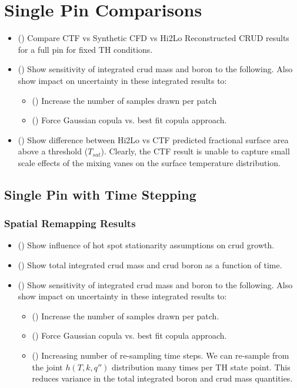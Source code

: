 \section{Single Pin Comparisons}

\begin{itemize}
    \item (\checkmark) Compare CTF vs Synthetic CFD vs Hi2Lo Reconstructed CRUD results for a full pin for fixed TH conditions.
    \item (\checkmark) Show sensitivity of integrated crud mass and boron to the following.  Also show impact on uncertainty in these integrated results to:
        \begin{itemize}
            \item (\checkmark) Increase the number of samples drawn per patch
            \item (\checkmark) Force Gaussian copula vs. best fit copula approach.
        \end{itemize}
    \item (\checkmark) Show difference between Hi2Lo vs CTF predicted fractional surface area above a threshold ($T_{sat}$).  Clearly, the CTF result
        is unable to capture small scale effects of the mixing vanes on the surface temperature distribution.
\end{itemize}

\subsection{Single Pin with Time Stepping}

\subsubsection{Spatial Remapping Results}
\begin{itemize}
    \item (\checkmark) Show influence of hot spot stationarity assumptions on crud growth.
\end{itemize}

\begin{itemize}
    \item (\checkmark) Show total integrated crud mass and crud boron as a function of time.
    \item (\checkmark) Show sensitivity of integrated crud mass and boron to the following.  Also show impact on uncertainty in these integrated results to:
        \begin{itemize}
            \item (\checkmark) Increase the number of samples drawn per patch.
            \item (\checkmark) Force Gaussian copula vs. best fit copula approach.
            \item (\checkmark) Increasing number of re-sampling time steps.
                We can re-sample from the joint $h(T, k, q'')$ distribution many times per TH state point.
                This reduces variance in the total integrated boron and crud mass quantities.
        \end{itemize}
\end{itemize}

